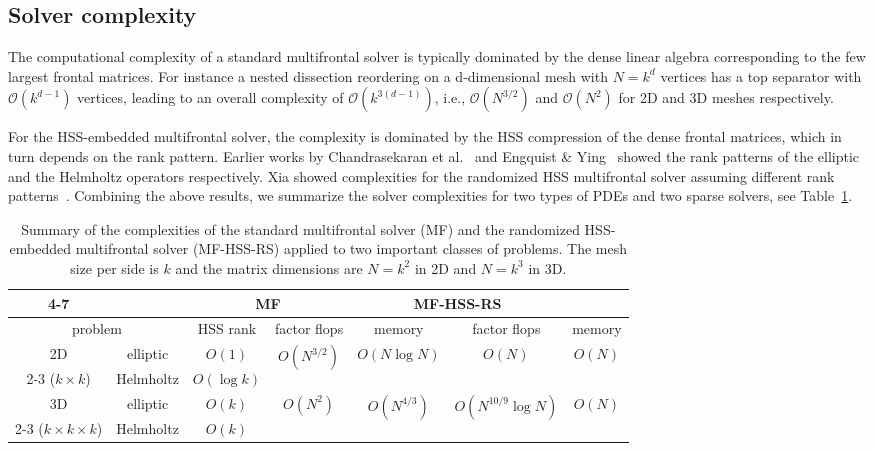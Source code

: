 \documentclass{article}
\begin{document}
\subsection{Solver complexity}
The computational complexity of a standard multifrontal solver is
typically dominated by the dense linear algebra corresponding to the
few largest frontal matrices. For instance a nested dissection
reordering on a d-dimensional mesh with $N = k^d$ vertices has a top
separator with $\mathcal{O}(k^{d-1})$ vertices, leading to an overall
complexity of $\mathcal{O}(k^{3(d-1)})$, i.e., $\mathcal{O}(N^{3/2})$
and $\mathcal{O}(N^2)$ for 2D and 3D meshes respectively.

For the HSS-embedded multifrontal solver, the complexity is dominated
by the HSS compression of the dense frontal matrices, which in turn
depends on the rank pattern. Earlier works by Chandrasekaran et
al.~\cite{chandrasekaran2010numerical} and Engquist \&
Ying~\cite{eng11} showed the rank patterns of the elliptic and the
Helmholtz operators respectively. Xia showed complexities for the
randomized HSS multifrontal solver assuming different rank
patterns~\cite{xia2013randomized}. Combining the above results, we
summarize the solver complexities for two types of PDEs and two sparse
solvers, see Table~\ref{tab:solver_complexity}.




\begin{table}[htp!]\footnotesize
  \centering
\renewcommand{\arraystretch}{1.15}
  \setlength{\tabcolsep}{.2em}
  \begin{tabular}
    [c]{|c|c|c|c|c|c|c|}
    \cline{4-7}
    \multicolumn{2}{}{} & & \multicolumn{2}{c|}{MF} & \multicolumn{2}{|c|}{MF-HSS-RS}\\\hline
    \multicolumn{2}{|c|}{problem} & HSS rank
& factor flops & memory & factor flops & memory\\\hline \hline
    {2D} & elliptic & $O(1)$ & \multirow{2}{*}{$O(N^{3/2})$} & \multirow{2}{*}{$O(N\log N)$}
    & \multirow{2}{*}{$O(N)$} & \multirow{2}{*}{$O(N)$}\\\cline{2-3}
    ($k\times k$)& Helmholtz & $O(\log k)$ &  &  &  & \\\hline
    {3D} & elliptic & $O(k)$ & \multirow{2}{*}{$O(N^{2})$} & \multirow{2}{*}{$O(N^{4/3})$}
    & \multirow{2}{*}{$O(N^{10/9}\log N)$} 
    & \multirow{2}{*}{$O(N)$}\\\cline{2-3}
    ($k\times k\times k$)& Helmholtz & $O(k)$ &  &  &  & \\\hline
  \end{tabular}
\caption{\footnotesize Summary of the complexities of the standard multifrontal solver (MF)
    and the randomized HSS-embedded multifrontal solver (MF-HSS-RS) applied to two important classes of problems.
    The mesh size per side is $k$ and the matrix dimensions are $N=k^2$
    in 2D and $N=k^3$ in 3D.}
  \label{tab:solver_complexity}
\end{table}
\end{document}
